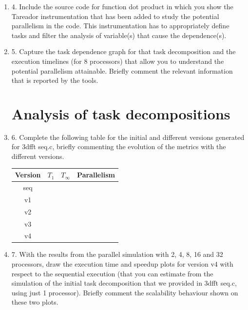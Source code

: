 \documentclass[12pt]{article}
\begin{document}
\begin{enumerate}
\item[] 4. Include the source code for function dot product in which you show the Tareador instrumentation that has been added to study the potential parallelism in the code. This instrumentation has to appropriately define tasks and filter the analysis of variable(s) that cause the dependence(s).




\item[] 5. Capture the task dependence graph for that task decomposition and the execution timelines (for 8 processors) that allow you to understand the potential parallelism attainable. Briefly comment the relevant information that is reported by the tools.








\section*{Analysis of task decompositions}

\item[] 6. Complete the following table for the initial and different versions generated for 3dfft seq.c, briefly
commenting the evolution of the metrics with the different versions.
\begin{center}
\begin{tabular}{| c || c | c | c | }
  \hline
  \textbf{Version} & $T_1$ & $T_{\infty}$ & \textbf{Parallelism}\\ \hline \hline
  seq &  &  & \\ \hline
  v1  &  &  & \\ \hline
  v2  &  &  & \\ \hline
  v3  &  &  & \\ \hline
  v4  &  &  & \\
  \hline

\end{tabular}
\end{center}



\item[] 7. With the results from the parallel simulation with 2, 4, 8, 16 and 32 processors, draw the execution
time and speedup plots for version v4 with respect to the sequential execution (that you can
estimate from the simulation of the initial task decomposition that we provided in 3dfft seq.c,
using just 1 processor). Briefly comment the scalability behaviour shown on these two plots.







\end{enumerate}
\end{document}
